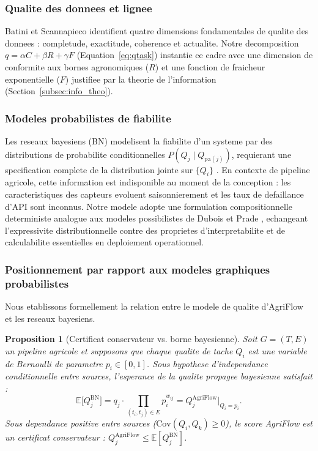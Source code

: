\documentclass[12pt,a4paper]{article}
\theoremstyle{plain}
\newtheorem{proposition}[theorem]{Proposition}
\theoremstyle{definition}
\theoremstyle{remark}
\newcommand{\E}{\mathbb{E}}
\begin{document}
	\subsubsection{Qualite des donnees et lignee}
	
	Batini et Scannapieco \cite{data_lineage_quality} identifient quatre
	dimensions fondamentales de qualite des donnees : completude, exactitude,
	coherence et actualite. Notre decomposition $q = \alpha C + \beta R +
	\gamma F$ (Equation~\eqref{eq:qtask}) instantie ce cadre avec une
	dimension de conformite aux bornes agronomiques ($R$) et une fonction
	de fraicheur exponentielle ($F$) justifiee par la theorie de l'information
	(Section~\ref{subsec:info_theo}).
	
	\subsubsection{Modeles probabilistes de fiabilite}
	
	Les reseaux bayesiens (BN) modelisent la fiabilite d'un systeme par
	des distributions de probabilite conditionnelles
	$P(Q_j \mid Q_{\text{pa}(j)})$, requierant une specification complete
	de la distribution jointe sur $\{Q_i\}$ \cite{bayesian_reliability}.
	En contexte de pipeline agricole, cette information est indisponible
	au moment de la conception : les caracteristiques des capteurs evoluent
	saisonnierement et les taux de defaillance d'API sont inconnus.
	Notre modele adopte une formulation compositionnelle deterministe
	analogue aux modeles possibilistes de Dubois et Prade
	\cite{possibility_theory}, echangeant l'expressivite distributionnelle
	contre des proprietes d'interpretabilite et de calculabilite essentielles
	en deploiement operationnel.
	
	\subsubsection{Positionnement par rapport aux modeles graphiques probabilistes}
	\label{subsec:pgm_positioning}
	
	Nous etablissons formellement la relation entre le modele de qualite
	d'AgriFlow et les reseaux bayesiens.
	
	\begin{proposition}[Certificat conservateur vs. borne bayesienne]
		\label{prop:bayes_bound}
		Soit $G=(T,E)$ un pipeline agricole et supposons que chaque qualite de
		tache $Q_i$ est une variable de Bernoulli de parametre $p_i \in [0,1]$.
		Sous hypothese d'independance conditionnelle entre sources,
		l'esperance de la qualite propagee bayesienne satisfait :
		\begin{equation}
			\E\bigl[Q_j^{\mathrm{BN}}\bigr]
			= q_j \cdot \prod_{(t_i,t_j)\in E} p_i^{w_{ij}}
			= Q_j^{\mathrm{AgriFlow}}\big|_{Q_i = p_i}.
			\label{eq:bayes_equiv}
		\end{equation}
		Sous dependance positive entre sources ($\text{Cov}(Q_i,Q_k) \geq 0$),
		le score AgriFlow est un certificat conservateur :
		$Q_j^{\mathrm{AgriFlow}} \leq \E[Q_j^{\mathrm{BN}}]$.
	\end{proposition}
	
\end{document}
